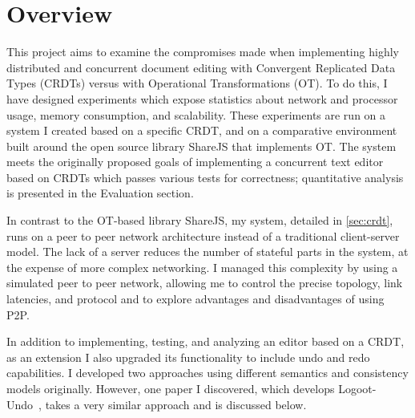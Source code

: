 \documentclass[12pt,a4paper,twoside,openright]{report}
\begin{document}


\section{Overview}
This project aims to examine the compromises made when implementing highly distributed and concurrent document editing with Convergent Replicated Data Types (CRDTs) versus with Operational Transformations (OT). To do this, I have designed experiments which expose statistics about network and processor usage, memory consumption, and scalability. These experiments are run on a system I created based on a specific CRDT, and on a comparative environment built around the open source library ShareJS that implements OT. The system meets the originally proposed goals of implementing a concurrent text editor based on CRDTs which passes various tests for correctness; quantitative analysis is presented in the Evaluation section. 

In contrast to the OT-based library ShareJS, my system, detailed in \cref{sec:crdt}, runs on a peer to peer network architecture instead of a traditional client-server model. The lack of a server reduces the number of stateful parts in the system, at the expense of more complex networking. I managed this complexity by using a simulated peer to peer network, allowing me to control the precise topology, link latencies, and protocol and to explore advantages and disadvantages of using P2P.

In addition to implementing, testing, and analyzing an editor based on a CRDT, as an extension I also upgraded its functionality to include undo and redo capabilities. I developed two approaches using different semantics and consistency models originally. However, one paper I discovered, which develops Logoot-Undo~\cite{weiss2010undo}, takes a very similar approach and is discussed below.
\end{document}
